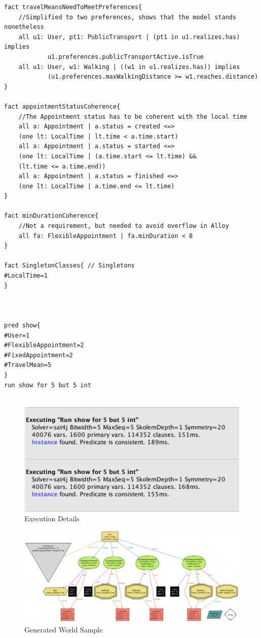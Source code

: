 \documentclass[12pt]{article}
\begin{document}
\begin{verbatim}
fact travelMeansNeedToMeetPreferences{
    //Simplified to two preferences, shows that the model stands nonetheless
    all u1: User, pt1: PublicTransport | (pt1 in u1.realizes.has) implies 
            u1.preferences.publicTransportActive.isTrue
    all u1: User, w1: Walking | ((w1 in u1.realizes.has)) implies 
            (u1.preferences.maxWalkingDistance >= w1.reaches.distance)
}

fact appointmentStatusCoherence{
    //The Appointment status has to be coherent with the local time
    all a: Appointment | a.status = created <=> 
    (one lt: LocalTime | lt.time < a.time.start)
    all a: Appointment | a.status = started <=> 
    (one lt: LocalTime | (a.time.start <= lt.time) && 
    (lt.time <= a.time.end))
    all a: Appointment | a.status = finished <=> 
    (one lt: LocalTime | a.time.end <= lt.time)
}

fact minDurationCoherence{
    //Not a requirement, but needed to avoid overflow in Alloy
    all fa: FlexibleAppointment | fa.minDuration < 8
}

fact SingletonClasses{ // Singletons
#LocalTime=1
}



pred show{
#User=1
#FlexibleAppointment=2
#FixedAppointment=2
#TravelMean=5
}
run show for 5 but 5 int


\end{verbatim}

\begin{figure}[H]
        \includegraphics[scale=0.8, origin=c]{executionDetail.png}
        \centering
        \caption{Execution Details}
    \label{fig:execDetail}
\end{figure}

\begin{figure}[H]
        \includegraphics[scale=0.46, angle=-90, origin=c]{generatedWorld1.png}
        \centering
        \caption{Generated World Sample}
    \label{fig:execDetail}
\end{figure}
\end{document}
